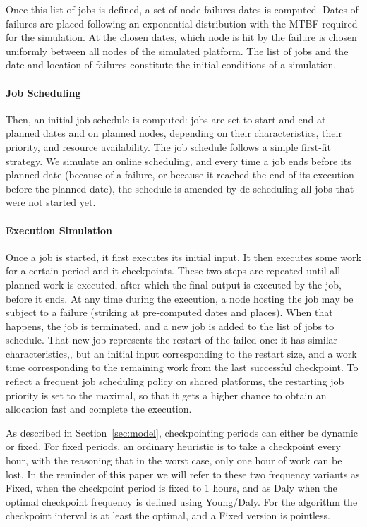 Once this list of jobs is defined, a set of node failures dates is
computed. Dates of failures are placed following an exponential
distribution with the MTBF required for the simulation. At the chosen
dates, which node is hit by the failure is chosen uniformly between
all nodes of the simulated platform. The list of jobs and the date and
location of failures constitute the initial conditions of a
simulation.

\paragraph*{Job Scheduling}
Then, an initial job schedule is computed: jobs are set to start and
end at planned dates and on planned nodes, depending on their
characteristics, their priority, and resource availability. The job
schedule follows a simple first-fit strategy. We simulate an online
scheduling, and every time a job ends before its planned date
(because of a failure, or because it reached the end of its execution
before the planned date), the schedule is amended by de-scheduling all
jobs that were not started yet.

\paragraph*{Execution Simulation}
Once a job is started, it first executes its initial input. It then
executes some work for a certain period and it checkpoints. These two
steps are repeated until all planned work is executed, after which the
final output is executed by the job, before it ends. At any time
during the execution, a node hosting the job may be subject to a
failure (striking at pre-computed dates and places). When that
happens, the job is terminated, and a new job is added to the list of
jobs to schedule. That new job represents the restart of the failed
one: it has similar characteristics,, but an initial input
corresponding to the restart size, and a work time corresponding to
the remaining work from the last successful checkpoint. To reflect a
frequent job scheduling policy on shared platforms, the restarting job
priority is set to the maximal, so that it gets a higher chance to
obtain an allocation fast and complete the execution.

As described in Section~\ref{sec:model}, checkpointing periods can
either be dynamic or fixed. For fixed periods, an ordinary heuristic
is to take a checkpoint every hour, with the reasoning that in the
worst case, only one hour of work can be lost. In the reminder of
this paper we will refer to these two frequency variants as Fixed,
when the checkpoint period is fixed to 1 hours, and as Daly when the
optimal checkpoint frequency is defined using Young/Daly. For the
\leastwaste algorithm the checkpoint interval is at least the optimal,
and a Fixed version is pointless.
\ifTR

